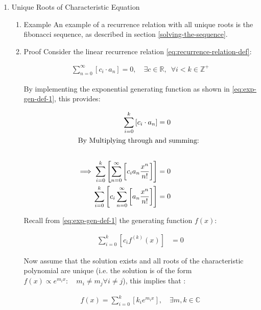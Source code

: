 \documentclass[11pt]{article}
\begin{document}
\begin{enumerate}
\item Unique Roots of Characteristic Equation
\label{uniq-roots-recurrence}
\begin{enumerate}
\item Example
\label{sec:org07d962b}
An example of a recurrence relation with all unique roots is the fibonacci sequence, as described in section \ref{solving-the-sequence}.
\item Proof
\label{sec:org25f2289}
Consider the linear recurrence relation \eqref{eq:recurrence-relation-def}:

\begin{align}
\sum^{\infty}_{n= 0}   \left[ c_i \cdot  a_n \right] = 0, \quad \exists c \in
\mathbb{R}, \enspace \forall i<k\in\mathbb{Z}^+ \nonumber
\end{align}

By implementing the exponential generating function as shown in \eqref{eq:exp-gen-def-1}, this provides:


\begin{align}
    \sum^{k}_{i= 0}   {\left[{ c_i \cdot a_n } \right]} = 0 \nonumber \\
    \intertext{By Multiplying through and summing: } \notag \\
     \implies  \sum^{k}_{i= 0}   {\left[{ \sum^{\infty}_{n= 0}   {\left[{ c_i a_n \frac{x^n}{n!} }\right]}  }\right]}  \nonumber = 0 \\
     \sum^{k}_{i= 0}    {\left[{ c_i \sum^{\infty}_{n= 0}   {\left[{  a_n \frac{x^n}{n!} }\right]}  }\right]}  \nonumber = 0 \\
\end{align}

Recall from \eqref{eq:exp-gen-def-1} the generating function \(f{\left({ x }\right)}\):

\begin{align}
\sum^{k}_{i= 0}   {\left[{ c_i f^{{\left({ k }\right)} } } {\left({ x }\right)} \right]} \label{eq:exp-gen-def-proof}  &= 0
\end{align}


Now assume that the solution exists and all roots of the characteristic polynomial are unique (i.e. the solution is of the form \(f{\left({ x }\right)} \propto e^{m_i x}: \quad m_i \neq m_j \forall i\neq j\)), this implies that  \cite[Ch. 4]{zillDifferentialEquations2009a} :

\begin{align}
    f{\left({ x }\right)} = \sum^{k}_{i= 0}   {\left[{ k_i e^{m_i x} }\right]}, \quad \exists m,k \in \mathbb{C} \nonumber
\end{align}


\end{enumerate}
\end{enumerate}
\end{document}
